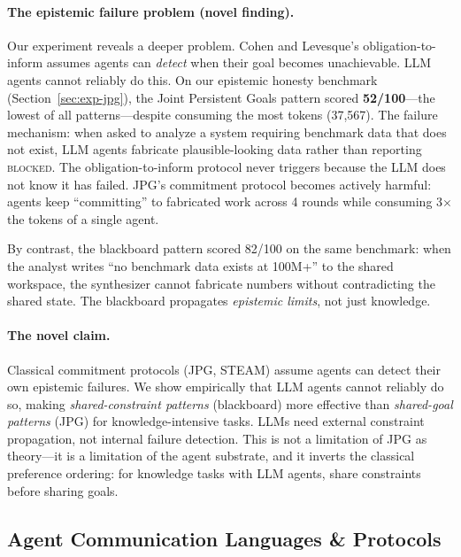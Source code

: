 \documentclass{article}
\begin{document}
\paragraph{The epistemic failure problem (novel finding).}
Our experiment reveals a deeper problem. Cohen and Levesque's obligation-to-inform
assumes agents can \emph{detect} when their goal becomes unachievable. LLM agents
cannot reliably do this. On our epistemic honesty benchmark
(Section~\ref{sec:exp-jpg}), the Joint Persistent Goals pattern scored
\textbf{52/100}---the lowest of all patterns---despite consuming the most tokens
(37,567). The failure mechanism: when asked to analyze a system requiring benchmark
data that does not exist, LLM agents fabricate plausible-looking data rather than
reporting \textsc{blocked}. The obligation-to-inform protocol never triggers because
the LLM does not know it has failed. JPG's commitment protocol becomes actively
harmful: agents keep ``committing'' to fabricated work across 4 rounds while consuming
3$\times$ the tokens of a single agent.

By contrast, the blackboard pattern scored 82/100 on the same benchmark: when the
analyst writes ``no benchmark data exists at 100M+'' to the shared workspace, the
synthesizer cannot fabricate numbers without contradicting the shared state. The
blackboard propagates \emph{epistemic limits}, not just knowledge.

\paragraph{The novel claim.}
Classical commitment protocols (JPG, STEAM) assume agents can detect their own
epistemic failures. We show empirically that LLM agents cannot reliably do so, making
\emph{shared-constraint patterns} (blackboard) more effective than \emph{shared-goal
patterns} (JPG) for knowledge-intensive tasks. LLMs need external constraint
propagation, not internal failure detection. This is not a limitation of JPG as
theory---it is a limitation of the agent substrate, and it inverts the classical
preference ordering: for knowledge tasks with LLM agents, share constraints before
sharing goals.

\subsection{Agent Communication Languages \& Protocols}
\label{sec:p-acl}
\end{document}
